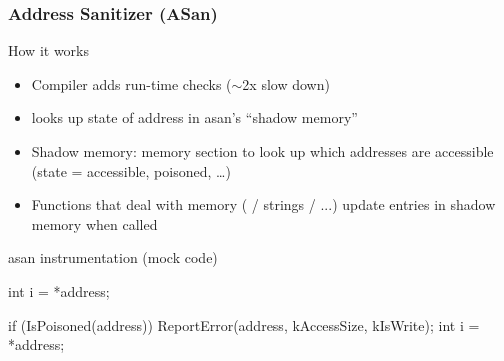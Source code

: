 \begin{frame}[fragile]
  \frametitle{Address Sanitizer (ASan)}
  \begin{block}{How it works}
    \begin{itemize}
      \item Compiler adds run-time checks ($\sim$2x slow down)
      \item {} looks up state of address in asan's ``shadow memory''
      \item Shadow memory: memory section to look up which addresses are accessible (state = accessible, poisoned, \ldots)
      \item Functions that deal with memory ( / strings / ...) update entries in shadow memory when called
    \end{itemize}
  \end{block}
  \begin{exampleblock}{asan instrumentation (mock code)}
    \begin{overprint}
      \vfill
      \begin{cppcode*}{}
        int i = *address;
      \end{cppcode*}
      \vfill
      \begin{cppcode*}{}
        if (IsPoisoned(address)) {
          ReportError(address, kAccessSize, kIsWrite);
        }
        int i = *address;
      \end{cppcode*}
    \end{overprint}
  \end{exampleblock}
\end{frame}


